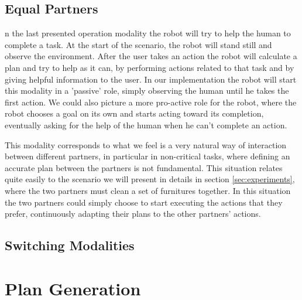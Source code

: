 \subsection{Equal Partners}
n the last presented operation modality the robot will try to help
the human to complete a task. At the start of the scenario, the robot
will stand still and observe the environment. After the user takes an
action the robot will calculate a plan and try to help as it can, by
performing actions related to that task and by giving helpful information to
the user. In our implementation the robot will start
this modality in a 'passive' role, simply observing the human until he
takes the first action. We could also picture a more pro-active role for
the robot, where the robot chooses a goal on its own and starts acting toward its
completion, eventually asking for the help of the human when he can't
complete an action. 

This modality corresponds to what we feel is a very natural way of
interaction between different partners, in particular in non-critical
tasks, where defining an accurate plan between the partners is not
fundamental. This situation relates quite easily to the scenario we
will present in details in section \ref{sec:experiments}, where the
two partners must clean a set of furnitures together. In this
situation the two partners could simply choose to start executing the
actions that they prefer, continuously adapting their plans to the
other partners' actions.  
\subsection{Switching Modalities}

\section{Plan Generation}
